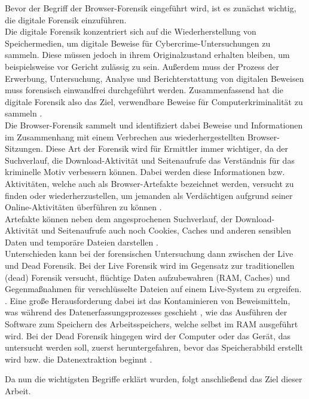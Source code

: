 Bevor der Begriff der Browser-Forensik eingeführt wird, ist es zunächst wichtig, die digitale Forensik einzuführen. \\
Die digitale Forensik konzentriert sich auf die Wiederherstellung von Speichermedien, um digitale Beweise für Cybercrime-Untersuchungen zu sammeln. Diese müssen jedoch in ihrem Originalzustand erhalten bleiben, um beispielsweise vor Gericht zulässig zu sein. Außerdem muss der Prozess der Erwerbung, Untersuchung, Analyse und Berichterstattung von digitalen Beweisen muss forensisch einwandfrei durchgeführt werden. Zusammenfassend hat die digitale Forensik also das Ziel, verwendbare Beweise für Computerkriminalität zu sammeln \cite{Izzati.2022}.\\
Die Browser-Forensik sammelt und identifiziert dabei Beweise und Informationen im Zusammenhang mit einem Verbrechen aus wiederhergestellten Browser-Sitzungen. Diese Art der Forensik wird für Ermittler immer wichtiger, da der Suchverlauf, die Download-Aktivität und Seitenaufrufe das Verständnis für das kriminelle Motiv verbessern können. Dabei werden diese Informationen bzw. Aktivitäten, welche auch als Browser-Artefakte bezeichnet werden, versucht zu finden oder wiederherzustellen, um jemanden als Verdächtigen aufgrund seiner Online-Aktivitäten überführen zu können \cite{Mahlous.2020}. \\
Artefakte können neben dem angesprochenen Suchverlauf, der Download-Aktivität und Seitenaufrufe auch noch Cookies, Caches und anderen sensiblen Daten und temporäre Dateien darstellen \cite{Izzati.2022}.\\
Unterschieden kann bei der forensischen Untersuchung dann zwischen der Live und Dead Forensik. Bei der Live Forensik wird im Gegensatz zur traditionellen (dead) Forensik versucht, flüchtige Daten aufzubewahren (RAM, Caches) und Gegenmaßnahmen für verschlüsselte Dateien auf einem Live-System zu ergreifen. \cite{Gupta.2013}. Eine große Herausforderung dabei ist das Kontaminieren von Beweismitteln, was während des Datenerfassungsprozesses geschieht \cite{Gupta.2013}, wie das Ausführen der Software zum Speichern des Arbeitsspeichers, welche selbst im RAM ausgeführt wird. Bei der Dead Forensik hingegen wird der Computer oder das Gerät, das untersucht werden soll, zuerst heruntergefahren, bevor das Speicherabbild erstellt wird bzw. die Datenextraktion beginnt \cite{Izzati.2022}.

Da nun die wichtigsten Begriffe erklärt wurden, folgt anschließend das Ziel dieser Arbeit.

